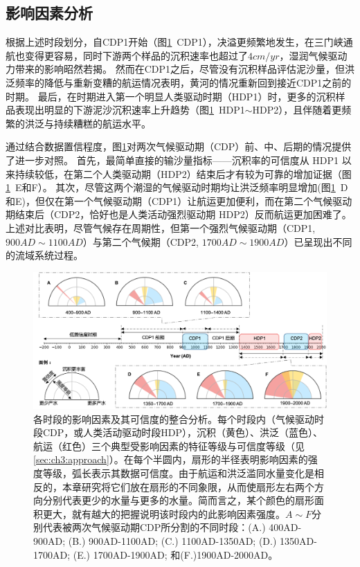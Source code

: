 \subsection{影响因素分析}

根据上述时段划分，自CDP1开始（图\ref{fig:ch3:impacts}~CDP1），决溢更频繁地发生，在三门峡通航也变得更容易，同时下游两个样品的沉积速率也超过了$4cm/yr$，湿润气候驱动力带来的影响昭然若揭。
然而在CDP1之后，尽管没有沉积样品评估泥沙量，但洪泛频率的降低与重新变糟的航运情况表明，黄河的情况重新回到接近CDP1之前的时期。
最后，在时期进入第一个明显人类驱动时期（HDP1）时，更多的沉积样品表现出明显的下游泥沙沉积速率上升趋势（图\ref{fig:ch3:impacts}~HDP1$\sim$HDP2），且伴随着更频繁的洪泛与持续糟糕的航运水平。


通过结合数据置信程度，图\ref{fig:ch3:impacts}对两次气候驱动期（CDP）前、中、后期的情况提供了进一步对照。
首先，最简单直接的输沙量指标——沉积率的可信度从 HDP1 以来持续较低，在第二个人类驱动期（HDP2）结束后才有较为可靠的增加证据（图\ref{fig:ch3:impacts}~E和F）。
其次，尽管这两个潮湿的气候驱动时期均让洪泛频率明显增加(图\ref{fig:ch3:impacts}~D和E)，但仅在第一个气候驱动期（CDP1）让航运更加便利，而在第二个气候驱动期结束后（CDP2，恰好也是人类活动强烈驱动期 HDP2）反而航运更加困难了。
上述对比表明，尽管气候存在周期性，但第一个强烈气候驱动期（CDP1, $900AD\sim1100AD$）与第二个气候期（CDP2, $1700AD\sim1900AD$）已呈现出不同的流域系统过程。

\begin{figure}[htb] %
    \includegraphics[width=\textwidth]{img/ch3/ch3_impacts.png}
    \caption[各时段的影响因素及其可信度的整合分析。]{各时段的影响因素及其可信度的整合分析。每个时段内（气候驱动时段CDP，或人类活动驱动时段HDP），沉积（黄色）、洪泛（蓝色）、航运（红色）三个典型受影响因素的特征等级与可信度等级（见\ref{sec:ch3:approach}）。在每个半圆内，扇形的半径表明影响因素的强度等级，弧长表示其数据可信度。由于航运和洪泛滥同水量变化是相反的，本章研究将它们放在扇形的不同象限，从而使扇形左右两个方向分别代表更少的水量与更多的水量。简而言之，某个颜色的扇形面积更大，就有越大的把握说明该时段内的此影响因素强度。$A \sim F$分别代表被两次气候驱动期CDP所分割的不同时段：(A.) 400AD-900AD; (B.) 900AD-1100AD; (C.) 1100AD-1350AD; (D.) 1350AD-1700AD; (E.) 1700AD-1900AD; 和(F.)1900AD-2000AD。}
    \label{fig:ch3:impacts}
\end{figure}

